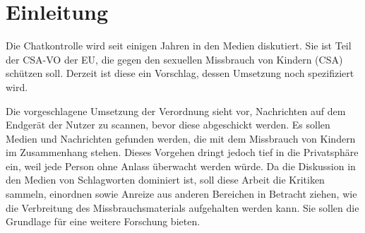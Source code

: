 \chapter{Einleitung} %
\label{ch:intro}

Die \glqq Chatkontrolle\grqq{} wird seit einigen Jahren in den Medien diskutiert. Sie ist Teil der \ac{CSA-VO} der \ac{EU}, die gegen den sexuellen Missbrauch von Kindern (\acf{CSA}) schützen soll. Derzeit ist diese ein Vorschlag, dessen Umsetzung noch spezifiziert wird.



Die vorgeschlagene Umsetzung der Verordnung sieht vor, Nachrichten auf dem Endgerät der Nutzer zu scannen, bevor diese abgeschickt werden. Es sollen Medien und Nachrichten gefunden werden, die mit dem Missbrauch von Kindern im Zusammenhang stehen.
Dieses Vorgehen dringt jedoch tief in die Privatsphäre ein, weil jede Person ohne Anlass überwacht werden würde. Da die Diskussion in den Medien von Schlagworten dominiert ist, soll diese Arbeit die Kritiken sammeln, einordnen sowie Anreize aus anderen Bereichen in Betracht ziehen, wie die Verbreitung des Missbrauchsmaterials aufgehalten werden kann. Sie sollen die Grundlage für eine weitere Forschung bieten.



